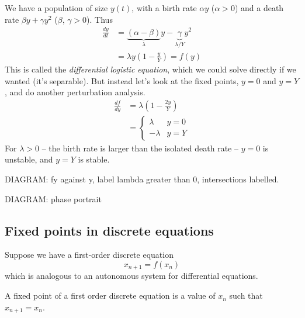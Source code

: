 \documentclass{../../template/note}
\begin{document}
    \begin{example}
        We have a population of size \(y(t)\), with a birth rate \(\alpha y\) (\(\alpha > 0\)) and a death rate \(\beta y + \gamma y^2\) (\(\beta\), \(\gamma > 0\)). Thus
        \begin{align*}
            \frac{dy}{dt} &= \underbrace{(\alpha - \beta)}_\lambda y - \underbrace{\gamma}_{\lambda/Y} y^2 \\
            &= \lambda y \left(1 - \frac{y}{Y}\right) = f(y)
        \end{align*}
        This is called the \emph{differential logistic equation}, which we could solve directly if we wanted (it's separable). But instead let's look at the fixed points, \(y = 0\) and \(y = Y\), and do another perturbation analysis.
        \begin{align*}
            \frac{df}{dy} &= \lambda\left(1-\frac{2y}{Y}\right) \\
            &= \begin{cases}
                \lambda & y = 0 \\
                -\lambda & y = Y
            \end{cases}
        \end{align*}
        For \(\lambda > 0\) -- the birth rate is larger than the isolated death rate -- \(y=0\) is unstable, and \(y = Y\) is stable. 

        DIAGRAM: fy against y, label lambda greater than 0, intersections labelled.

        DIAGRAM: phase portrait
        
        
    \end{example}
    
    \subsection{Fixed points in discrete equations}

    Suppose we have a first-order discrete equation
    \[
        x_{n+1} = f(x_n)
    \]
    which is analogous to an autonomous system for differential equations.

    \begin{definition}
        A fixed point of a first order discrete equation is a value of \(x_n\) such that \(x_{n+1} = x_n\).
    \end{definition}
    
\end{document}
